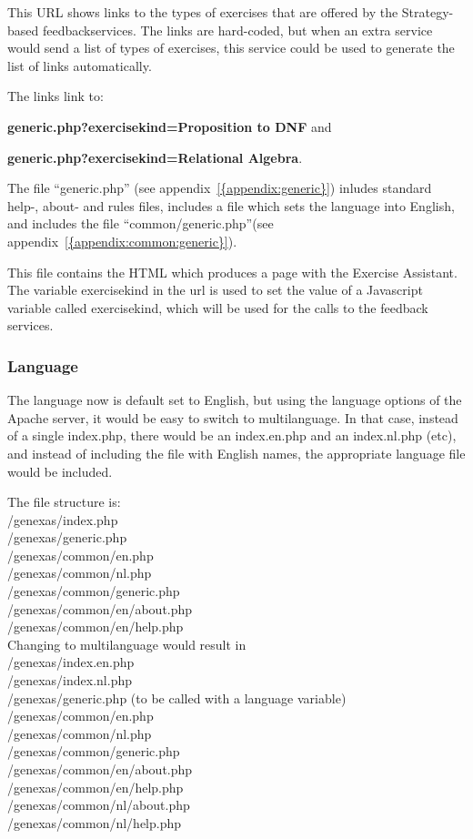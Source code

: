 \documentclass{article}
\begin{document}
This URL shows links to the types of exercises that are
offered by the Strategy-based feedbackservices. The links are hard-coded, but when an
extra service would send a list of types of exercises, this service could be used to 
generate the list of links automatically.


The links link to:

\textbf{generic.php?exercisekind=Proposition to DNF} and

\textbf{generic.php?exercisekind=Relational Algebra}.


The file ``generic.php'' (see appendix~\ref{{appendix:generic}}) inludes standard help-, about- and rules files, includes a file which sets the language into English, and includes the file ``common/generic.php''(see appendix~\ref{{appendix:common:generic}}).

This file contains the HTML which produces a page with the Exercise Assistant. The variable exercisekind in the url is used to set the value of a Javascript variable called exercisekind, which will be used for the calls to the feedback services.

\subsubsection{Language}
The language now is default set to English, but using the language options of the Apache server, it would be easy to switch to multilanguage. In that case, instead of a single index.php, there would be an index.en.php and an index.nl.php (etc), and instead of including the file with English names, the appropriate language file would be included.

The file structure is:\\
/genexas/index.php \\
/genexas/generic.php \\
/genexas/common/en.php \\
/genexas/common/nl.php \\
/genexas/common/generic.php \\
/genexas/common/en/about.php \\
/genexas/common/en/help.php \\

Changing to multilanguage would result in\\
/genexas/index.en.php \\
/genexas/index.nl.php \\
/genexas/generic.php (to be called with a language variable)\\
/genexas/common/en.php \\
/genexas/common/nl.php \\
/genexas/common/generic.php \\
/genexas/common/en/about.php \\
/genexas/common/en/help.php \\
/genexas/common/nl/about.php \\
/genexas/common/nl/help.php \\
\end{document}

